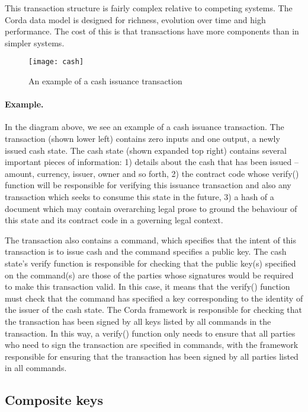 \documentclass{article}
\begin{document}
This transaction structure is fairly complex relative to competing systems. The Corda data model is designed for
richness, evolution over time and high performance. The cost of this is that transactions have more components than
in simpler systems.

\begin{figure}[H]
\texttt{[image: cash]}
\caption{An example of a cash issuance transaction}
\end{figure}

\paragraph{Example.}In the diagram above, we see an example of a cash issuance transaction. The transaction (shown
lower left) contains zero inputs and one output, a newly issued cash state. The cash state (shown expanded top
right) contains several important pieces of information: 1) details about the cash that has been issued -- amount,
currency, issuer, owner and so forth, 2) the contract code whose verify() function will be responsible for
verifying this issuance transaction and also any transaction which seeks to consume this state in the future, 3) a
hash of a document which may contain overarching legal prose to ground the behaviour of this state and its contract
code in a governing legal context.

The transaction also contains a command, which specifies that the intent of this transaction is to issue cash and
the command specifies a public key. The cash state's verify function is responsible for checking that the public
key(s) specified on the command(s) are those of the parties whose signatures would be required to make this
transaction valid. In this case, it means that the verify() function must check that the command has specified a
key corresponding to the identity of the issuer of the cash state. The Corda framework is responsible for checking
that the transaction has been signed by all keys listed by all commands in the transaction. In this way, a verify()
function only needs to ensure that all parties who need to sign the transaction are specified in commands, with the
framework responsible for ensuring that the transaction has been signed by all parties listed in all commands.

\subsection{Composite keys}\label{sec:composite-keys}
\end{document}
